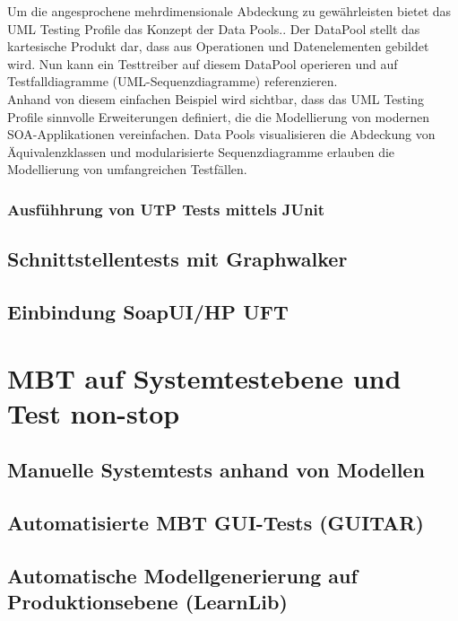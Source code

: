 Um die angesprochene mehrdimensionale Abdeckung zu gewährleisten bietet das UML Testing Profile das Konzept der Data Pools.. Der DataPool stellt das kartesische Produkt dar, dass aus Operationen und Datenelementen gebildet wird. Nun kann ein Testtreiber auf diesem DataPool operieren und auf Testfalldiagramme (UML-Sequenzdiagramme) referenzieren.\\
Anhand von diesem einfachen Beispiel wird sichtbar, dass das UML Testing Profile sinnvolle Erweiterungen definiert, die die Modellierung von modernen SOA-Applikationen vereinfachen. Data Pools visualisieren die Abdeckung von Äquivalenzklassen und modularisierte Sequenzdiagramme erlauben die Modellierung von umfangreichen Testfällen. 


\subsubsection{Ausfühhrung von UTP Tests mittels JUnit}

\subsection{Schnittstellentests mit Graphwalker}
\subsection{Einbindung SoapUI/HP UFT}


\section{MBT auf Systemtestebene und Test non-stop}
\subsection{Manuelle Systemtests anhand von Modellen}
\subsection{Automatisierte MBT GUI-Tests (GUITAR)}
\subsection{Automatische Modellgenerierung auf Produktionsebene (LearnLib)}
